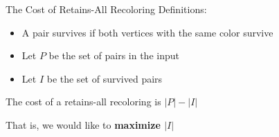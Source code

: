 \begin{frame}{The Cost of Retains-All Recoloring}
Definitions:
\begin{itemize}

\pause\item
A pair \alert{survives} if both vertices with the same color survive

\pause\item
Let $P$ be the set of pairs in the input  

\pause\item
Let $I$ be the set of survived pairs
 
\end{itemize}

\pause\begin{observation}
The cost of a retains-all recoloring is $|P| - |I|$
\end{observation}

\pause
That is, we would like to \textbf{maximize $|I|$}

\end{frame}